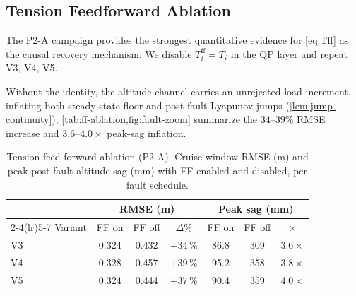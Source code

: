 \documentclass[lettersize,journal]{IEEEtran}
\begin{document}
\subsection{Tension Feedforward Ablation}
\label{sec:VI-D}

The P2-A campaign provides the strongest quantitative evidence for \eqref{eq:Tff} as the causal recovery mechanism. We disable $T_i^{\mathrm{ff}} = T_i$ in the QP layer and repeat V3, V4, V5.

Without the identity, the altitude channel carries an unrejected load increment, inflating both steady-state floor and post-fault Lyapunov jumps (\cref{lem:jump-continuity}); \cref{tab:ff-ablation,fig:fault-zoom} summarize the $34$--$39\%$ RMSE increase and $3.6$--$4.0\times$ peak-sag inflation.

\begin{table}[t]
  \caption{Tension feed-forward ablation (P2-A). Cruise-window RMSE (m) and peak post-fault altitude sag (mm) with FF enabled and disabled, per fault schedule.}
  \label{tab:ff-ablation}
  \centering
  \small
  \renewcommand{\arraystretch}{1.05}
  \begin{tabular}{lcccccc}
    \toprule
    & \multicolumn{3}{c}{RMSE (m)} & \multicolumn{3}{c}{Peak sag (mm)} \\
    \cmidrule(lr){2-4}\cmidrule(lr){5-7}
    Variant & FF on & FF off & $\Delta$\% & FF on & FF off & $\times$ \\
    \midrule
    V3 & 0.324 & 0.432 & $+34\,\%$ & 86.8 & 309 & $3.6\times$ \\
    V4 & 0.328 & 0.457 & $+39\,\%$ & 95.2 & 358 & $3.8\times$ \\
    V5 & 0.324 & 0.444 & $+37\,\%$ & 90.4 & 359 & $4.0\times$ \\
    \bottomrule
  \end{tabular}
\end{table}
\end{document}
